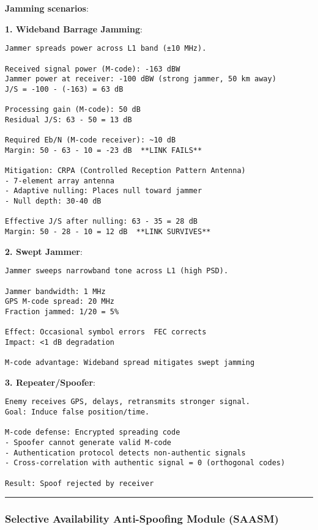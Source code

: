 \textbf{Jamming scenarios}:

\textbf{1. Wideband Barrage Jamming}:

\begin{verbatim}
Jammer spreads power across L1 band (±10 MHz).

Received signal power (M-code): -163 dBW
Jammer power at receiver: -100 dBW (strong jammer, 50 km away)
J/S = -100 - (-163) = 63 dB

Processing gain (M-code): 50 dB
Residual J/S: 63 - 50 = 13 dB

Required Eb/N (M-code receiver): ~10 dB
Margin: 50 - 63 - 10 = -23 dB  **LINK FAILS**

Mitigation: CRPA (Controlled Reception Pattern Antenna)
- 7-element array antenna
- Adaptive nulling: Places null toward jammer
- Null depth: 30-40 dB

Effective J/S after nulling: 63 - 35 = 28 dB
Margin: 50 - 28 - 10 = 12 dB  **LINK SURVIVES**
\end{verbatim}

\textbf{2. Swept Jammer}:

\begin{verbatim}
Jammer sweeps narrowband tone across L1 (high PSD).

Jammer bandwidth: 1 MHz
GPS M-code spread: 20 MHz
Fraction jammed: 1/20 = 5%

Effect: Occasional symbol errors  FEC corrects
Impact: <1 dB degradation

M-code advantage: Wideband spread mitigates swept jamming
\end{verbatim}

\textbf{3. Repeater/Spoofer}:

\begin{verbatim}
Enemy receives GPS, delays, retransmits stronger signal.
Goal: Induce false position/time.

M-code defense: Encrypted spreading code
- Spoofer cannot generate valid M-code
- Authentication protocol detects non-authentic signals
- Cross-correlation with authentic signal = 0 (orthogonal codes)

Result: Spoof rejected by receiver
\end{verbatim}

\begin{center}\rule{0.5\linewidth}{0.5pt}\end{center}

\subsubsection{Selective Availability Anti-Spoofing Module
(SAASM)}\label{selective-availability-anti-spoofing-module-saasm}


